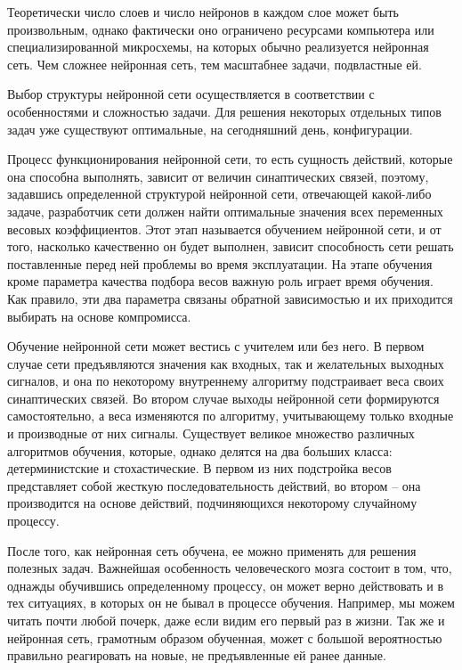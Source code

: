 Теоретически число слоев и число нейронов в каждом слое может быть произвольным,
однако фактически оно ограничено ресурсами компьютера или специализированной
микросхемы, на которых обычно реализуется нейронная сеть. Чем сложнее нейронная
сеть, тем масштабнее задачи, подвластные ей.

Выбор структуры нейронной сети осуществляется в соответствии с особенностями и
сложностью задачи. Для решения некоторых отдельных типов задач уже существуют
оптимальные, на сегодняшний день, конфигурации.

Процесс функционирования нейронной сети, то есть сущность действий, которые она
способна выполнять, зависит от величин синаптических связей, поэтому, задавшись
определенной структурой нейронной сети, отвечающей какой-либо задаче,
разработчик сети должен найти оптимальные значения всех переменных весовых
коэффициентов. Этот этап называется обучением нейронной сети, и от того,
насколько качественно он будет выполнен, зависит способность сети решать
поставленные перед ней проблемы во время эксплуатации. На этапе обучения кроме
параметра качества подбора весов важную роль играет время обучения. Как правило,
эти два параметра связаны обратной зависимостью и их приходится выбирать на
основе компромисса.

Обучение нейронной сети может вестись с учителем или без него. В первом случае
сети предъявляются значения как входных, так и желательных выходных сигналов, и
она по некоторому внутреннему алгоритму подстраивает веса своих синаптических
связей. Во втором случае выходы нейронной сети формируются самостоятельно, а
веса изменяются по алгоритму, учитывающему только входные и производные от них
сигналы. Существует великое множество различных алгоритмов обучения, которые,
однако делятся на два больших класса: детерминистские и стохастические. В первом
из них подстройка весов представляет собой жесткую последовательность действий,
во втором – она производится на основе действий, подчиняющихся некоторому
случайному процессу.

После того, как нейронная сеть обучена, ее можно применять для решения полезных
задач. Важнейшая особенность человеческого мозга состоит в том, что, однажды
обучившись определенному процессу, он может верно действовать и в тех ситуациях,
в которых он не бывал в процессе обучения. Например, мы можем читать почти любой
почерк, даже если видим его первый раз в жизни. Так же и нейронная сеть,
грамотным образом обученная, может с большой вероятностью правильно реагировать
на новые, не предъявленные ей ранее данные.

